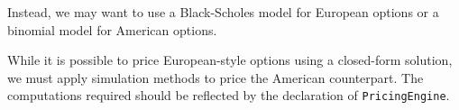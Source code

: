 Instead, we may want to use a Black-Scholes model for European
options or a binomial model for American options\cite{HULL}.

While it is possible to price European-style options using a closed-form 
solution, we must apply simulation methods to price the American counterpart.
The computations required should be reflected by the declaration of
\texttt{PricingEngine}.
